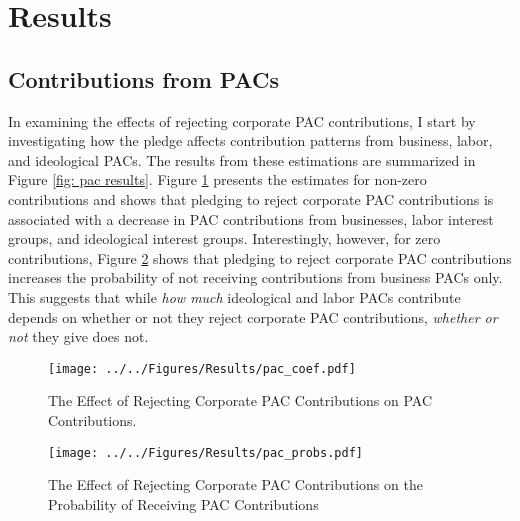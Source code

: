 \documentclass[12pt]{article}
\begin{document}
\section{Results}

\subsection{Contributions from PACs}

In examining the effects of rejecting corporate PAC contributions, I start by investigating how the pledge affects contribution patterns from business, labor, and ideological PACs. The results from these estimations are summarized in Figure \ref{fig: pac results}. Figure \ref{fig: pac coefs} presents the estimates for non-zero contributions and shows that pledging to reject corporate PAC contributions is associated with a decrease in PAC contributions from businesses, labor interest groups, and ideological interest groups. Interestingly, however, for zero contributions, Figure \ref{fig: pac probs} shows that pledging to reject corporate PAC contributions increases the probability of not receiving contributions from business PACs only. This suggests that while \emph{how much} ideological and labor PACs contribute depends on whether or not they reject corporate PAC contributions, \emph{whether or not} they give does not. 

\begin{figure*}[!htb]
    \centering
    \begin{subfigure}[b]{0.65\textwidth}
        \centering
        \texttt{[image: ../../Figures/Results/pac\_coef.pdf]}
        \caption{The Effect of Rejecting Corporate PAC Contributions on PAC Contributions.}
        \label{fig: pac coefs}
    \end{subfigure}
    
    \begin{subfigure}[b]{0.65\textwidth}
        \centering
        \texttt{[image: ../../Figures/Results/pac\_probs.pdf]}
        \caption{The Effect of Rejecting Corporate PAC Contributions on the Probability of Receiving PAC Contributions}
        \label{fig: pac probs}
    \end{subfigure}
    \caption{\textbf{The Effect of Rejecting Corporate PAC Contributions on PAC Contributions and the Probability of Receiving Money from PACs.} These figures present the posterior distributions estimated for a candidate that pledges to reject corporate PAC contributions. The dot shows the median coefficient estimate and the intervals show the 50\% and 89\% highest density intervals. Figure \ref{fig: pac coefs} shows that candidates that pledge to reject corporate PAC contributions experience a reduction in contributions from all types of PACs. Figure \ref{fig: pac probs} shows that rejecting corporate PAC contributions increases the probability of not receiving contributions from business PACs. See Table \ref{tbl: pac results} for the formal estimates.}
    \label{fig: pac results}
\end{figure*}
\end{document}
